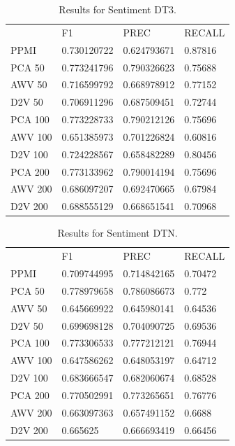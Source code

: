 \begin{table}[]
	\begin{tabular}{llll}
		& F1          & PREC        & RECALL  \\
		PPMI    & 0.730120722 & 0.624793671 & 0.87816 \\
		PCA 50  & 0.773241796 & 0.790326623 & 0.75688 \\
		AWV 50  & 0.716599792 & 0.668978912 & 0.77152 \\
		D2V 50  & 0.706911296 & 0.687509451 & 0.72744 \\
		PCA 100 & 0.773228733 & 0.790212126 & 0.75696 \\
		AWV 100 & 0.651385973 & 0.701226824 & 0.60816 \\
		D2V 100 & 0.724228567 & 0.658482289 & 0.80456 \\
		PCA 200 & 0.773133962 & 0.790014194 & 0.75696 \\
		AWV 200 & 0.686097207 & 0.692470665 & 0.67984 \\
		D2V 200 & 0.688555129 & 0.668651541 & 0.70968
	\end{tabular}
	\caption{Results for Sentiment DT3.}
	\label{table:Newsgroups}
\end{table}

\begin{table}[]
	\begin{tabular}{llll}
		& F1          & PREC        & RECALL  \\
		PPMI    & 0.709744995 & 0.714842165 & 0.70472 \\
		PCA 50  & 0.778979658 & 0.786086673 & 0.772   \\
		AWV 50  & 0.645669922 & 0.645980141 & 0.64536 \\
		D2V 50  & 0.699698128 & 0.704090725 & 0.69536 \\
		PCA 100 & 0.773306533 & 0.777212121 & 0.76944 \\
		AWV 100 & 0.647586262 & 0.648053197 & 0.64712 \\
		D2V 100 & 0.683666547 & 0.682060674 & 0.68528 \\
		PCA 200 & 0.770502991 & 0.773265651 & 0.76776 \\
		AWV 200 & 0.663097363 & 0.657491152 & 0.6688  \\
		D2V 200 & 0.665625    & 0.666693419 & 0.66456
	\end{tabular}
	\caption{Results for Sentiment DTN.}
	\label{table:Newsgroups}
\end{table}

